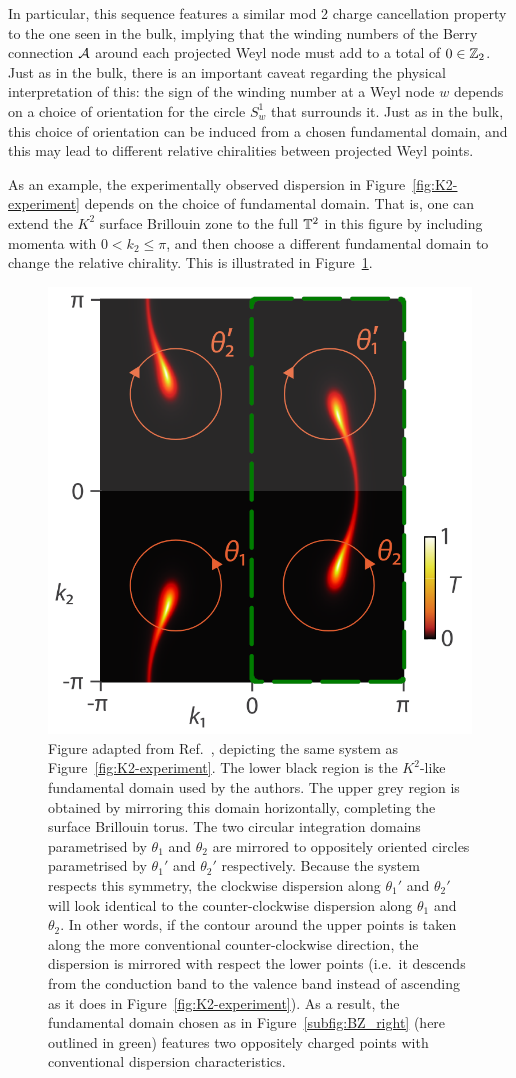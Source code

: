 In particular, this sequence features a similar mod 2 charge cancellation property to the one seen in the bulk, implying that the winding numbers of the Berry connection $\mathcal{A}$ around each projected Weyl node must add to a total of $0\in\mathbb{Z}_2$. Just as in the bulk, there is an important caveat regarding the physical interpretation of this: the sign of the winding number at a Weyl node $w$ depends on a choice of orientation for the circle $S_w^1$ that surrounds it. Just as in the bulk, this choice of orientation can be induced from a chosen fundamental domain, and this may lead to different relative chiralities between projected Weyl points.

As an example, the experimentally observed dispersion in Figure~\ref{fig:K2-experiment} depends on the choice of fundamental domain. That is, one can extend the $K^2$ surface Brillouin zone to the full $\mathbb{T}^2$ in this figure by including momenta with $0<k_2\leq\pi$, and then choose a different fundamental domain to change the relative chirality. This is illustrated in Figure~\ref{fig:K2-experiment-alt}.
\begin{figure}[htb!]
	\centering
	\includegraphics[width=.5\linewidth]{Images/K2-experiment-alt}
	\caption{Figure adapted from Ref.~\cite{Fonseca-Vaidya_nonorientable}, depicting the same system as Figure~\ref{fig:K2-experiment}. The lower black region is the $K^2$-like fundamental domain used by the authors. The upper grey region is obtained by mirroring this domain horizontally, completing the surface Brillouin torus. The two circular integration domains parametrised by $\theta_1$ and $\theta_2$ are mirrored to oppositely oriented circles parametrised by $\theta_1'$ and $\theta_2'$ respectively. Because the system respects this symmetry, the clockwise dispersion along $\theta_1'$ and $\theta_2'$ will look identical to the counter-clockwise dispersion along $\theta_1$ and $\theta_2$. In other words, if the contour around the upper points is taken along the more conventional counter-clockwise direction, the dispersion is mirrored with respect the lower points (i.e.\ it descends from the conduction band to the valence band instead of ascending as it does in Figure~\ref{fig:K2-experiment}). As a result, the fundamental domain chosen as in Figure~\ref{subfig:BZ_right} (here outlined in green) features two oppositely charged points with conventional dispersion characteristics.}
	\label{fig:K2-experiment-alt}
\end{figure}

